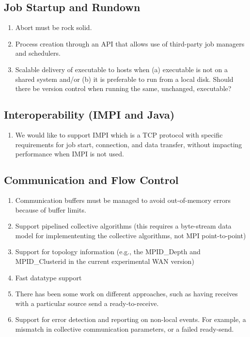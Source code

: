 \documentclass{article}
\begin{document}
\subsection{Job Startup and Rundown}
\begin{enumerate}
\item Abort must be rock solid.
\item Process creation through an API that allows use of third-party job
  managers and schedulers.
\item Scalable delivery of executable to hosts when (a) executable is not on a
  shared system and/or (b) it is preferable to run from a local disk.  Should
  there be version   control when running the same, unchanged, executable?
\end{enumerate}

\subsection{Interoperability (IMPI and Java)}
\begin{enumerate}
\item We would like to support IMPI which is a TCP protocol with specific
  requirements for job start, connection, and data transfer, without impacting
  performance when IMPI is not used.
\end{enumerate}

\subsection{Communication and Flow Control}
\begin{enumerate}
\item Communication buffers must be managed to avoid out-of-memory errors
  because of buffer limits.
\item Support pipelined collective algorithms (this requires a byte-stream
  data model for implemententing the collective algorithms, not MPI
  point-to-point) 
\item Support for topology information (e.g., the MPID\_Depth and
  MPID\_Clusterid in the current experimental WAN version)
\item Fast datatype support
\item There has been some work on different approaches, such as having
  receives with a particular source send a ready-to-receive.
\item Support for error detection and reporting on non-local events.  For
  example, a mismatch in collective communication parameters, or a failed
  ready-send. 
\end{enumerate}
\end{document}
